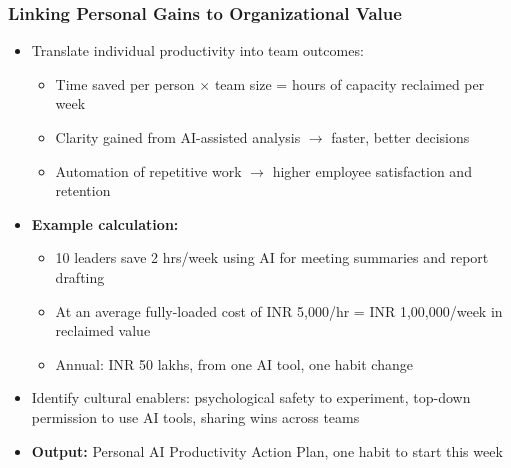 \begin{frame}[fragile]\frametitle{Linking Personal Gains to Organizational Value}

\begin{itemize}
  \item Translate individual productivity into team outcomes:
    \begin{itemize}
      \item Time saved per person $\times$ team size = hours of capacity reclaimed per week
      \item Clarity gained from AI-assisted analysis $\rightarrow$ faster, better decisions
      \item Automation of repetitive work $\rightarrow$ higher employee satisfaction and retention
    \end{itemize}
  \item \textbf{Example calculation:}
    \begin{itemize}
      \item 10 leaders save 2 hrs/week using AI for meeting summaries and report drafting
      \item At an average fully-loaded cost of \textsf{\small INR 5,000/hr} = \textsf{\small INR 1,00,000/week} in reclaimed value
      \item Annual: \textsf{\small INR 50 lakhs}, from one AI tool, one habit change
    \end{itemize}
  \item Identify cultural enablers: psychological safety to experiment, top-down permission to use AI tools, sharing wins across teams
  \item \textbf{Output:} Personal AI Productivity Action Plan, one habit to start this week
\end{itemize}

\end{frame}


